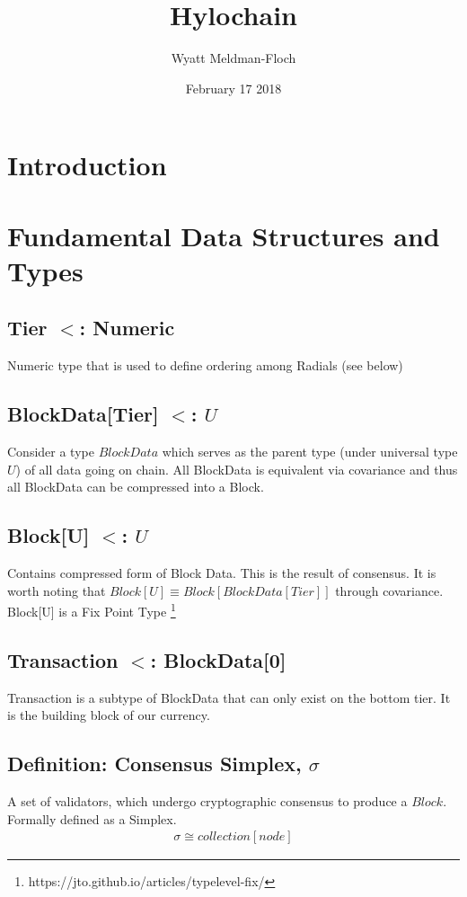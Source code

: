 \documentclass{article}
\title{Hylochain}
\author{Wyatt Meldman-Floch}
\date{February 17 2018}
\begin{document}
\maketitle

\begin{abstract}


\end{abstract}
\setcounter{secnumdepth}{0}
\section{Introduction}

\section{Fundamental Data Structures and Types}
\subsection{Tier $<$: Numeric}
Numeric type that is used to define ordering among Radials (see below)

\subsection{BlockData[Tier] $<$: $U$}
Consider a type $BlockData$ which serves as the parent type (under universal type $U$) of all data going on chain. All BlockData is equivalent via covariance and thus all BlockData can be compressed into a Block.

\subsection{Block[U] $<$: $U$}
Contains compressed form of Block Data. This is the result of consensus. It is worth noting that $Block[U] \equiv Block[BlockData[Tier]]$ through covariance. Block[U] is a Fix Point Type \footnote{https://jto.github.io/articles/typelevel-fix/}

\subsection{Transaction $<$: BlockData[0]}
Transaction is a subtype of BlockData that can only exist on the bottom tier. It is the building block of our currency.

\subsection{Definition: Consensus Simplex, $\sigma$}
A set of validators, which undergo cryptographic consensus to produce a $Block$. Formally defined as a Simplex.
\begin{equation} \label{eq1}
\begin{split}
\sigma \cong collection[node]
\end{split}
\end{equation}
\end{document}
